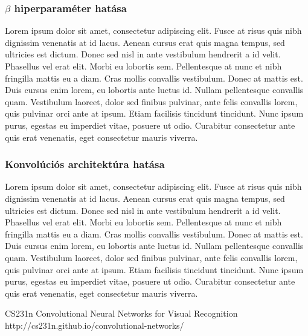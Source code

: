 \documentclass[12pt]{article}
\begin{document}
\subsubsection{$\beta$ hiperparaméter hatása}

Lorem ipsum dolor sit amet, consectetur adipiscing elit. Fusce at risus quis nibh dignissim venenatis at id lacus. Aenean cursus erat quis magna tempus, sed ultricies est dictum. Donec sed nisl in ante vestibulum hendrerit a id velit. Phasellus vel erat elit. Morbi eu lobortis sem. Pellentesque at nunc et nibh fringilla mattis eu a diam. Cras mollis convallis vestibulum. Donec at mattis est. Duis cursus enim lorem, eu lobortis ante luctus id. Nullam pellentesque convallis quam. Vestibulum laoreet, dolor sed finibus pulvinar, ante felis convallis lorem, quis pulvinar orci ante at ipsum. Etiam facilisis tincidunt tincidunt. Nunc ipsum purus, egestas eu imperdiet vitae, posuere ut odio. Curabitur consectetur ante quis erat venenatis, eget consectetur mauris viverra.

\subsubsection{Konvolúciós architektúra hatása}

Lorem ipsum dolor sit amet, consectetur adipiscing elit. Fusce at risus quis nibh dignissim venenatis at id lacus. Aenean cursus erat quis magna tempus, sed ultricies est dictum. Donec sed nisl in ante vestibulum hendrerit a id velit. Phasellus vel erat elit. Morbi eu lobortis sem. Pellentesque at nunc et nibh fringilla mattis eu a diam. Cras mollis convallis vestibulum. Donec at mattis est. Duis cursus enim lorem, eu lobortis ante luctus id. Nullam pellentesque convallis quam. Vestibulum laoreet, dolor sed finibus pulvinar, ante felis convallis lorem, quis pulvinar orci ante at ipsum. Etiam facilisis tincidunt tincidunt. Nunc ipsum purus, egestas eu imperdiet vitae, posuere ut odio. Curabitur consectetur ante quis erat venenatis, eget consectetur mauris viverra.

\begin{thebibliography}{9}

CS231n Convolutional Neural Networks for Visual Recognition
http://cs231n.github.io/convolutional-networks/

\end{thebibliography}
\end{document}
